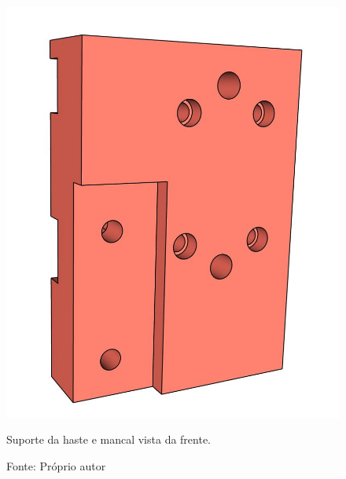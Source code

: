 \begin{figure}[H]
\centering
\includegraphics[scale = 0.4]{figuras/ressuportehastemancalf}
\caption{Suporte da haste e mancal vista da frente.}
\caption*{Fonte: Próprio autor}
\label{fig:ressuportehastemancalf}
\end{figure}

